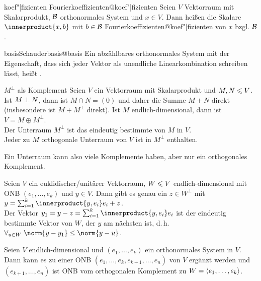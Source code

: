 \begin{xDef}{koef"|fizienten}%
{Fourierkoeffizienten@koef"|fizienten}
    Seien $V$ Vektorraum mit Skalarprodukt, $\mathcal{B}$ orthonormales
    System und $x \in V$.
    Dann heißen die Skalare $\innerproduct{x, b}$ mit $b \in \mathcal{B}$
    {Fourierkoeffizienten@koef"|fizienten}
    von $x$ bzgl. $\mathcal{B}$.
\end{xDef}

\begin{xDef}{basis}{Schauderbasis@basis}
    Ein abzählbares orthonormales System mit der Eigenschaft, dass sich jeder
    Vektor als unendliche Linearkombination schreiben lässt, heißt
    .
\end{xDef}

\begin{Satz}{$M^\bot$ als Komplement}
    Seien $V$ ein Vektorraum mit Skalarprodukt und $M, N \leqslant V$. \\
    Ist $M \;\bot\; N$, dann ist $M \cap N = (0)$ und daher die Summe $M + N$
    direkt (insbesondere ist $M + M^\bot$ direkt).
    Ist $M$ endlich-dimensional, dann ist $V = M \oplus M^\bot$. \\
    Der Unterraum $M^\bot$ ist das eindeutig bestimmte
     von $M$ in $V$. \\
    Jeder zu $M$ orthogonale Unterraum von $V$ ist in $M^\bot$ enthalten.
\end{Satz}

\begin{Bem}
    Ein Unterraum kann also viele Komplemente haben, aber nur ein orthogonales
    Komplement.
\end{Bem}

\begin{Kor}
    Seien $V$ ein euklidischer/unitärer Vektorraum,
    $W \leqslant V$ endlich-dimensional mit ONB $(e_1, ..., e_k)$ und $y \in V$.
    Dann gibt es genau ein $z \in W^\bot$ mit
    $y = \sum_{i=1}^k \innerproduct{y, e_i}e_i + z$. \\
    Der Vektor $y_1 = y - z = \sum_{i=1}^k \innerproduct{y, e_i}e_i$ ist der
    eindeutig bestimmte Vektor von $W$, der $y$ am nächsten ist, d.\,h.
    $\forall_{u \in W}\; \norm{y - y_1} \le \norm{y - u}$.
\end{Kor}

\begin{Kor}
    Seien $V$ endlich-dimensional und $(e_1, \ldots, e_k)$ ein orthonormales
    System in $V$. \\
    Dann kann es zu einer ONB $(e_1, \ldots, e_k, e_{k+1}, \ldots, e_n)$
    von $V$ ergänzt werden und $(e_{k+1}, \ldots, e_n)$ ist ONB vom
    orthogonalen Komplement zu $W = \langle e_1, \ldots, e_k \rangle$.
\end{Kor}

